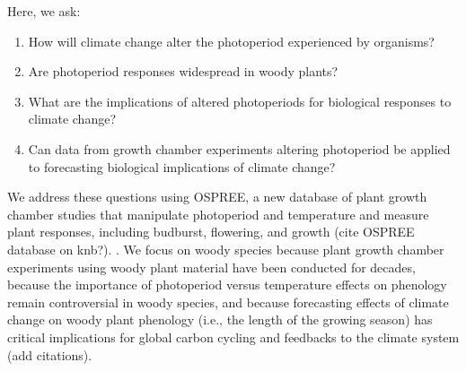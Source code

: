 \documentclass{article}
\begin{document}
\par Here, we ask: 
\begin{enumerate}
\item How will climate change alter the photoperiod experienced by organisms? %
\item Are photoperiod responses widespread in woody plants? %
\item What are the implications of altered photoperiods for biological responses to climate change?
\item Can data from growth chamber experiments altering photoperiod be applied to forecasting biological implications of climate change?

\end{enumerate}
\par We address these questions using OSPREE, a new database of plant growth chamber studies that manipulate photoperiod and temperature and measure plant responses, including budburst, flowering, and growth (cite OSPREE database on knb?).          .  %
We focus on woody species because plant growth chamber experiments using woody plant material have been conducted for decades, because the importance of photoperiod versus temperature effects on phenology remain controversial in woody species, and because forecasting effects of climate change on woody plant phenology (i.e., the length of the growing season) has critical implications for global carbon cycling and feedbacks to the climate system (add citations). 
\end{document}
